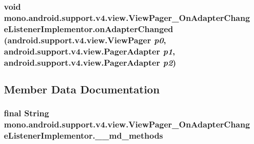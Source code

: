 \hypertarget{classmono_1_1android_1_1support_1_1v4_1_1view_1_1_view_pager___on_adapter_change_listener_implementor_a7fc7de992a40dc7b7225b610a738b88}{
\subsubsection[{onAdapterChanged}]{\setlength{\rightskip}{0pt plus 5cm}void mono.android.support.v4.view.ViewPager\_\-OnAdapterChangeListenerImplementor.onAdapterChanged (android.support.v4.view.ViewPager {\em p0}, \/  android.support.v4.view.PagerAdapter {\em p1}, \/  android.support.v4.view.PagerAdapter {\em p2})}}
\label{classmono_1_1android_1_1support_1_1v4_1_1view_1_1_view_pager___on_adapter_change_listener_implementor_a7fc7de992a40dc7b7225b610a738b88}




\subsection{Member Data Documentation}
\hypertarget{classmono_1_1android_1_1support_1_1v4_1_1view_1_1_view_pager___on_adapter_change_listener_implementor_4159f6e0c54d8a9a269b8b2624c37a5a}{
\subsubsection[{\_\-\_\-md\_\-methods}]{\setlength{\rightskip}{0pt plus 5cm}final String {\bf mono.android.support.v4.view.ViewPager\_\-OnAdapterChangeListenerImplementor.\_\-\_\-md\_\-methods}}}
\label{classmono_1_1android_1_1support_1_1v4_1_1view_1_1_view_pager___on_adapter_change_listener_implementor_4159f6e0c54d8a9a269b8b2624c37a5a}


